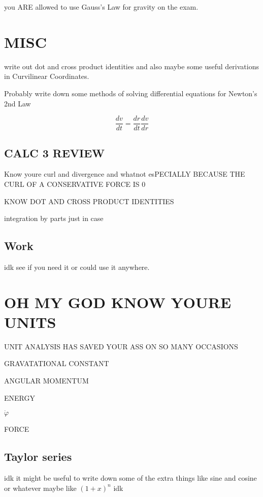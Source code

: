 \documentclass[fleqn]{article}
\begin{document}
you ARE allowed to use Gauss's Law for gravity on the exam. 



\section{MISC}
write out dot and cross product identities and also maybe some useful derivations in Curvilinear Coordinates. 

Probably write down some methods of solving differential equations for Newton's 2nd Law 

\[
\frac{dv}{dt} = \frac{dr}{dt} \frac{dv}{dr}
\]

\subsection{CALC 3 REVIEW }
Know youre curl and divergence and whatnot esPECIALLY BECAUSE THE CURL OF A CONSERVATIVE FORCE IS 0 

KNOW DOT AND CROSS PRODUCT IDENTITIES

integration by parts just in case 
\subsection{Work}
idk see if you need it or could use it anywhere. 

\section{OH MY GOD KNOW YOURE UNITS}
UNIT ANALYSIS HAS SAVED YOUR ASS ON SO MANY OCCASIONS

GRAVATATIONAL CONSTANT 

ANGULAR MOMENTUM 

ENERGY 

$\dot \varphi$ 

FORCE 

\subsection{Taylor series}
idk it might be useful to write down some of the extra things like sine and cosine or whatever maybe like $(1 + x)^n$ idk
\end{document}
